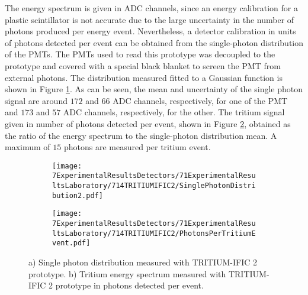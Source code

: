 The energy spectrum is given in ADC channels, since an energy calibration for a plastic scintillator is not accurate due to the large uncertainty in the number of photons produced per energy event. Nevertheless, a detector calibration in units of photons detected per event can be obtained from the single-photon distribution of the PMTs. The PMTs used to read this prototype was decoupled to the prototype and covered with a special black blanket to screen the PMT from external photons. The distribution measured fitted to a Gaussian function is shown in Figure \ref{subfig:SinglePhotonDistributionIFIC2}. As can be seen, the mean and uncertainty of the single photon signal are around $172$ and $66$ ADC channels, respectively, for one of the PMT and $173$ and $57$ ADC channels, respectively, for the other. The tritium signal given in number of photons detected per event, shown in Figure \ref{subfig:TritiumSignalTRITIUMIFIC2}, obtained as the ratio of the energy spectrum to the single-photon distribution mean. A maximum of $15$ photons are measured per tritium event.%

\begin{figure}
\centering
    \begin{subfigure}[b]{0.73\textwidth}
    \centering
    \texttt{[image: 7ExperimentalResultsDetectors/71ExperimentalResultsLaboratory/714TRITIUMIFIC2/SinglePhotonDistribution2.pdf]}  
    \caption{\label{subfig:SinglePhotonDistributionIFIC2}}
    \end{subfigure}
    \hfill
    \begin{subfigure}[b]{0.73\textwidth}
    \centering
    \texttt{[image: 7ExperimentalResultsDetectors/71ExperimentalResultsLaboratory/714TRITIUMIFIC2/PhotonsPerTritiumEvent.pdf]}  
    \caption{\label{subfig:TritiumSignalTRITIUMIFIC2}}
    \end{subfigure}
 \caption{a) Single photon distribution measured with TRITIUM-IFIC 2 prototype. b) Tritium energy spectrum measured with TRITIUM-IFIC 2 prototype in photons detected per event.}
 \label{fig:PhotonsPerTritiumEventIFIC2}
\end{figure}


